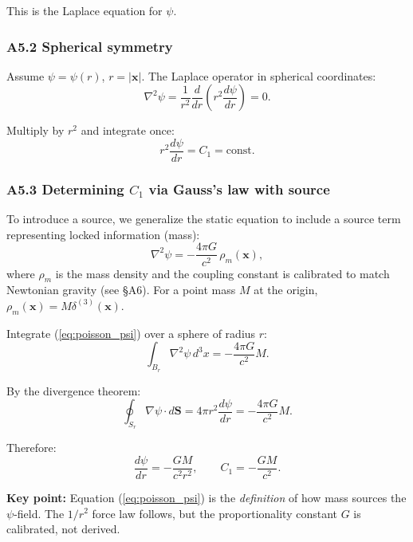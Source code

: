 \documentclass[reprint]{revtex4-2}
\begin{document}
This is the Laplace equation for $\psi$.

\subsubsection{A5.2 Spherical symmetry}

Assume $\psi = \psi(r)$, $r=|\mathbf{x}|$. The Laplace operator in spherical coordinates:
\begin{equation}
\nabla^2\psi = \frac{1}{r^2}\frac{d}{dr}\left(r^2\frac{d\psi}{dr}\right) = 0.
\end{equation}

Multiply by $r^2$ and integrate once:
\begin{equation}
r^2\frac{d\psi}{dr} = C_1 = \text{const}.
\label{eq:first_integral}
\end{equation}

\subsubsection{A5.3 Determining $C_1$ via Gauss's law with source}

To introduce a source, we generalize the static equation to include a source term representing locked information (mass):
\begin{equation}
\nabla^2\psi = -\frac{4\pi G}{c^2}\,\rho_m(\mathbf{x}),
\label{eq:poisson_psi}
\end{equation}
where $\rho_m$ is the mass density and the coupling constant is calibrated to match Newtonian gravity (see \S A6). For a point mass $M$ at the origin, $\rho_m(\mathbf{x}) = M\delta^{(3)}(\mathbf{x})$.

Integrate (\ref{eq:poisson_psi}) over a sphere of radius $r$:
\begin{equation}
\int_{B_r} \nabla^2\psi\,d^3x = -\frac{4\pi G}{c^2}M.
\end{equation}

By the divergence theorem:
\begin{equation}
\oint_{S_r} \nabla\psi\cdot d\mathbf{S} = 4\pi r^2\frac{d\psi}{dr} = -\frac{4\pi G}{c^2}M.
\end{equation}

Therefore:
\begin{equation}
\frac{d\psi}{dr} = -\frac{GM}{c^2 r^2}, \qquad C_1 = -\frac{GM}{c^2}.
\label{eq:C1_value}
\end{equation}

\textbf{Key point:} Equation (\ref{eq:poisson_psi}) is the \emph{definition} of how mass sources the $\psi$-field. The $1/r^2$ force law follows, but the proportionality constant $G$ is calibrated, not derived.
\end{document}
